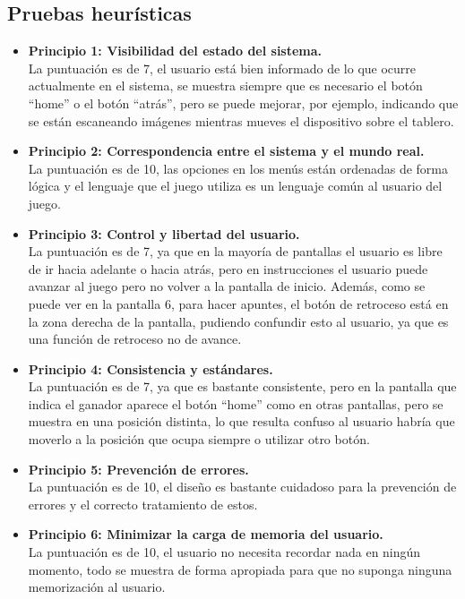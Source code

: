 \subsection{Pruebas heurísticas}
\begin{itemize}

  \item \textbf{Principio 1: Visibilidad del estado del sistema.}\\
  La puntuación es de 7, el usuario está bien informado de lo que ocurre actualmente en el sistema, se muestra siempre que es necesario el botón “home” o el botón “atrás”, pero se puede mejorar, por ejemplo, indicando que se están escaneando imágenes mientras mueves el dispositivo sobre el tablero.

  \item \textbf{Principio 2: Correspondencia entre el sistema y el mundo real.}\\
  La puntuación es de 10, las opciones en los menús están ordenadas de forma lógica y el lenguaje que el juego utiliza es un lenguaje común al usuario del juego.

  \item \textbf{Principio 3: Control y libertad del usuario.}\\
  La puntuación es de 7, ya que en la mayoría de pantallas el usuario es libre de ir hacia adelante o hacia atrás, pero en instrucciones el usuario puede avanzar al juego pero no volver a la pantalla de inicio. Además, como se puede ver en la pantalla 6, para hacer apuntes, el botón de retroceso está en la zona derecha de la pantalla, pudiendo confundir esto al usuario, ya que es una función de retroceso no de avance.

  \item \textbf{Principio 4: Consistencia y estándares.}\\
  La puntuación es de 7, ya que es bastante consistente, pero en la pantalla que indica el ganador aparece el botón “home” como en otras pantallas, pero se muestra en una posición distinta, lo que resulta confuso al usuario habría que moverlo a la posición que ocupa siempre o utilizar otro botón.

  \item \textbf{Principio 5: Prevención de errores.}\\
  La puntuación es de 10, el diseño es bastante cuidadoso para la prevención de errores y el correcto tratamiento de estos.

  \item \textbf{Principio 6: Minimizar la carga de memoria del usuario.}\\
  La puntuación es de 10, el usuario no necesita recordar nada en ningún momento, todo se muestra de forma apropiada para que no suponga ninguna memorización al usuario.


\end{itemize}
